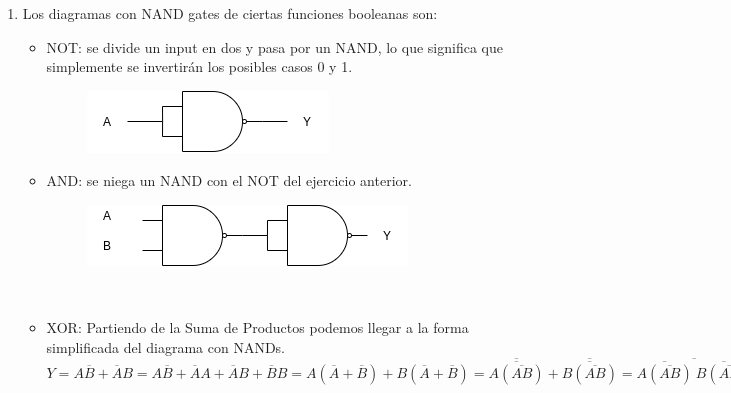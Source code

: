\documentclass[11pt,a4paper]{article}
\begin{document}
\begin{enumerate}
\item Los diagramas con NAND gates de ciertas funciones booleanas son:
\begin{itemize}
\item NOT: se divide un input en dos y pasa por un NAND, lo que significa que simplemente se invertirán los posibles casos 0 y 1.
\begin{figure}[h!]
\centering
\includegraphics[scale=0.5]{2.png} 
\end{figure}
\item AND: se niega un NAND con el NOT del ejercicio anterior.
\begin{figure}[h!]
\centering
\includegraphics[scale=0.5]{3.png} 
\end{figure}
\\
\item XOR: Partiendo de la Suma de Productos podemos llegar a la forma simplificada del diagrama con NANDs.
 $Y = A\overline{B}+\overline{A}B=
 A\overline{B} + \overline{A}A + \overline{A}B + \overline{B}B=A(\overline{A}+\overline{B}) + B(\overline{A}+\overline{B}) = \overline{\overline{A(\overline{AB})}}+\overline{\overline{B(\overline{AB})}} = \overline{\overline{A(\overline{AB})} \    
 \overline{B(\overline{AB})}}$
 

\end{itemize}
\end{enumerate}
\end{document}
